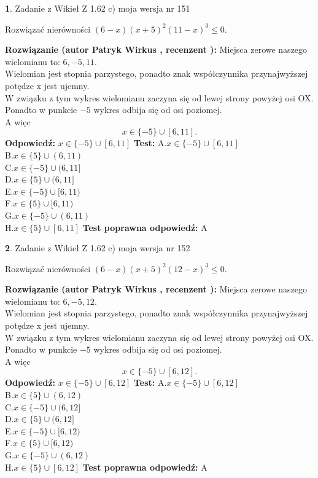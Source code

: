 \documentclass[12pt, a4paper]{article}
\theoremstyle{definition} %
\newtheorem{zad}{}
\newcommand{\zadStart}[1]{\begin{zad}#1\newline}
\newcommand{\zadStop}{\end{zad}}
\newcommand{\rozwStart}[2]{\noindent \textbf{Rozwiązanie (autor #1 , recenzent #2): }\newline}
\newcommand{\rozwStop}{\newline}
\newcommand{\odpStart}{\noindent \textbf{Odpowiedź:}\newline}
\newcommand{\odpStop}{\newline}
\newcommand{\testStart}{\noindent \textbf{Test:}\newline}
\newcommand{\testStop}{\newline}
\newcommand{\kluczStart}{\noindent \textbf{Test poprawna odpowiedź:}\newline}
\newcommand{\kluczStop}{\newline}
\begin{document}
\zadStart{Zadanie z Wikieł Z 1.62 c) moja wersja nr 151}

Rozwiązać nierówności $(6-x)(x+5)^{2}(11-x)^{3}\le0$.
\zadStop
\rozwStart{Patryk Wirkus}{}
Miejsca zerowe naszego wielomianu to: $6, -5, 11$.\\
Wielomian jest stopnia parzystego, ponadto znak współczynnika przy\linebreak najwyższej potędze x jest ujemny.\\ W związku z tym wykres wielomianu zaczyna się od lewej strony powyżej osi OX.\\
Ponadto w punkcie $-5$ wykres odbija się od osi poziomej.\\
A więc $$x \in \{-5\} \cup [6,11].$$
\rozwStop
\odpStart
$x \in \{-5\} \cup [6,11]$
\odpStop
\testStart
A.$x \in \{-5\} \cup [6,11]$\\
B.$x \in \{5\} \cup (6,11)$\\
C.$x \in \{-5\} \cup (6,11]$\\
D.$x \in \{5\} \cup (6,11]$\\
E.$x \in \{-5\} \cup [6,11)$\\
F.$x \in \{5\} \cup [6,11)$\\
G.$x \in \{-5\} \cup (6,11)$\\
H.$x \in \{5\} \cup [6,11]$
\testStop
\kluczStart
A
\kluczStop



\zadStart{Zadanie z Wikieł Z 1.62 c) moja wersja nr 152}

Rozwiązać nierówności $(6-x)(x+5)^{2}(12-x)^{3}\le0$.
\zadStop
\rozwStart{Patryk Wirkus}{}
Miejsca zerowe naszego wielomianu to: $6, -5, 12$.\\
Wielomian jest stopnia parzystego, ponadto znak współczynnika przy\linebreak najwyższej potędze x jest ujemny.\\ W związku z tym wykres wielomianu zaczyna się od lewej strony powyżej osi OX.\\
Ponadto w punkcie $-5$ wykres odbija się od osi poziomej.\\
A więc $$x \in \{-5\} \cup [6,12].$$
\rozwStop
\odpStart
$x \in \{-5\} \cup [6,12]$
\odpStop
\testStart
A.$x \in \{-5\} \cup [6,12]$\\
B.$x \in \{5\} \cup (6,12)$\\
C.$x \in \{-5\} \cup (6,12]$\\
D.$x \in \{5\} \cup (6,12]$\\
E.$x \in \{-5\} \cup [6,12)$\\
F.$x \in \{5\} \cup [6,12)$\\
G.$x \in \{-5\} \cup (6,12)$\\
H.$x \in \{5\} \cup [6,12]$
\testStop
\kluczStart
A
\kluczStop
\end{document}
